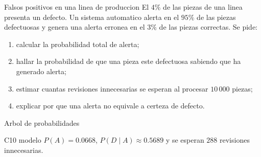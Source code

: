 \begin{contextproblem}{Falsos positivos en una linea de produccion}
El \(4\%\) de las piezas de una linea presenta un defecto. Un sistema automatico alerta en el
\(95\%\) de las piezas defectuosas y genera una alerta erronea en el \(3\%\) de las piezas
correctas. Se pide:
\begin{enumerate}
  \item calcular la probabilidad total de alerta;
  \item hallar la probabilidad de que una pieza este defectuosa sabiendo que ha generado alerta;
  \item estimar cuantas revisiones innecesarias se esperan al procesar \(10\,000\) piezas;
  \item explicar por que una alerta no equivale a certeza de defecto.
\end{enumerate}
\end{contextproblem}

\begin{databox}{Arbol de probabilidades}
\begin{center}
\end{center}
\end{databox}

\begin{shortanswer}{C10 modelo}
\(P(A)=0.0668\), \(P(D\mid A)\approx0.5689\) y se esperan \(288\) revisiones innecesarias.
\end{shortanswer}

